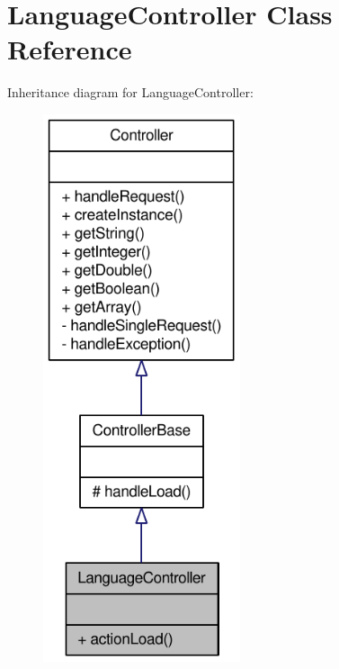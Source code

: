 \hypertarget{classLanguageController}{
\section{LanguageController Class Reference}
\label{classLanguageController}
}


Inheritance diagram for LanguageController:\nopagebreak
\begin{figure}[H]
\begin{center}
\leavevmode
\includegraphics[width=164pt]{classLanguageController__inherit__graph}
\end{center}
\end{figure}


